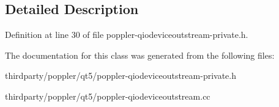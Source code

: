 \subsection{Detailed Description}


Definition at line 30 of file poppler-\/qiodeviceoutstream-\/private.\+h.



The documentation for this class was generated from the following files\+:\begin{DoxyCompactItemize}
\item 
thirdparty/poppler/qt5/poppler-\/qiodeviceoutstream-\/private.\+h\item 
thirdparty/poppler/qt5/poppler-\/qiodeviceoutstream.\+cc\end{DoxyCompactItemize}
